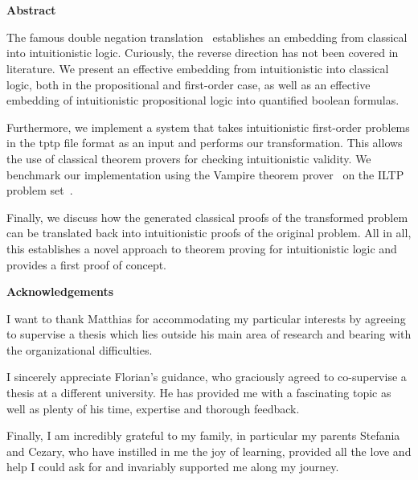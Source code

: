 \documentclass[a4paper,11pt]{report}
\theoremstyle{definition}
\theoremstyle{definition}
\theoremstyle{definition}
\theoremstyle{definition}
\theoremstyle{definition}
\theoremstyle{definition}
\theoremstyle{definition}
\begin{document}
	\newpage
	\
	\newpage
	
		
		\
		\vfill
		\onehalfspacing
		\begin{center}
		\bfseries Abstract		
		\end{center}
		The famous double negation translation~\cite{glivenko1929quelques, godel1933intuitionistischen} establishes an embedding from classical into intuitionistic logic. Curiously, the reverse direction has not been covered in literature. We present an effective embedding from intuitionistic into classical logic, both in the propositional and first-order case, as well as an effective embedding of intuitionistic propositional logic into quantified boolean formulas.
		
		Furthermore, we implement a system that takes intuitionistic first-order problems in the tptp file format as an input and performs our transformation. This allows the use of classical theorem provers for checking intuitionistic validity. We benchmark our implementation using the Vampire theorem prover~\cite{kovacs2013first} on the ILTP problem set~\cite{iltp}.
		
		Finally, we discuss how the generated classical proofs of the transformed problem can be translated back into intuitionistic proofs of the original problem. All in all, this establishes a novel approach to theorem proving for intuitionistic logic and provides a first proof of concept.

	\vspace*{1cm}
	\begin{center}
		\bfseries Acknowledgements		
	\end{center}
	
	I want to thank Matthias for accommodating my particular interests by agreeing to supervise a thesis which lies outside his main area of research and bearing with the organizational difficulties.
	
	I sincerely appreciate Florian's guidance, who graciously agreed to co-supervise a thesis at a different university. He has provided me with a fascinating topic as well as plenty of his time, expertise and thorough feedback.
	
	Finally, I am incredibly grateful to my family, in particular my parents Stefania and Cezary, who have instilled in me the joy of learning, provided all the love and help I could ask for and invariably supported me along my journey.
	
\end{document}
